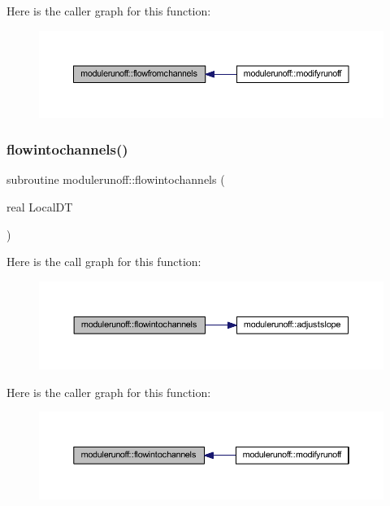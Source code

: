 Here is the caller graph for this function\+:\nopagebreak
\begin{figure}[H]
\begin{center}
\leavevmode
\includegraphics[width=350pt]{namespacemodulerunoff_ad9add85fb1e5efe5eb239bb72e597945_icgraph}
\end{center}
\end{figure}
\mbox{\label{namespacemodulerunoff_a08312a51cf0c25b5c2019c42750e1673}} 
\subsubsection{\texorpdfstring{flowintochannels()}{flowintochannels()}}
{\footnotesize\ttfamily subroutine modulerunoff\+::flowintochannels (\begin{DoxyParamCaption}\item[{real}]{Local\+DT }\end{DoxyParamCaption})\hspace{0.3cm}{\ttfamily [private]}}

Here is the call graph for this function\+:\nopagebreak
\begin{figure}[H]
\begin{center}
\leavevmode
\includegraphics[width=350pt]{namespacemodulerunoff_a08312a51cf0c25b5c2019c42750e1673_cgraph}
\end{center}
\end{figure}
Here is the caller graph for this function\+:\nopagebreak
\begin{figure}[H]
\begin{center}
\leavevmode
\includegraphics[width=350pt]{namespacemodulerunoff_a08312a51cf0c25b5c2019c42750e1673_icgraph}
\end{center}
\end{figure}
\mbox{\label{namespacemodulerunoff_a94d1c021f061e9cfa1f07c3845541525}} 
